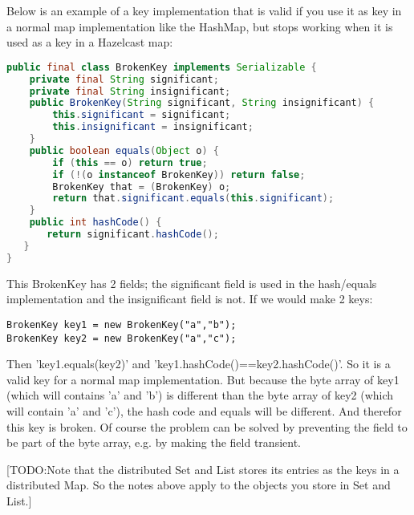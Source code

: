 Below is an example of a key implementation that is valid if you use it as key in a normal map implementation like the HashMap, but stops working when it is used as a key in a Hazelcast map:
\begin{lstlisting}[language=java]
public final class BrokenKey implements Serializable {
    private final String significant;
    private final String insignificant;
    public BrokenKey(String significant, String insignificant) {
        this.significant = significant;
        this.insignificant = insignificant;
    }
    public boolean equals(Object o) {
        if (this == o) return true;
        if (!(o instanceof BrokenKey)) return false;
        BrokenKey that = (BrokenKey) o;
        return that.significant.equals(this.significant);
    }
    public int hashCode() {
       return significant.hashCode();
   }
}
\end{lstlisting}
This BrokenKey has 2 fields; the significant field is used in the hash/equals implementation and the insignificant field is not. If we would make 2 keys:
\begin{lstlisting}
BrokenKey key1 = new BrokenKey("a","b");
BrokenKey key2 = new BrokenKey("a","c");
\end{lstlisting} 
Then 'key1.equals(key2)' and 'key1.hashCode()==key2.hashCode()'. So it is a valid key for a normal map implementation. But because the byte array of key1 (which will contains 'a' and 'b') is different than the byte array of key2 (which will contain 'a' and 'c'), the hash code and equals will be different. And therefor this key is broken. Of course the problem can be solved by preventing the field to be part of the byte array, e.g. by making the field transient.

[TODO:Note that the distributed Set and List stores its entries as the keys in a distributed Map. So the notes above apply to the objects you store in Set and List.]

